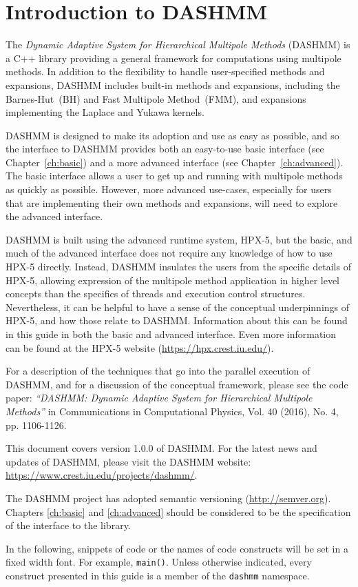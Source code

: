 \chapter{Introduction to DASHMM}
\label{ch:intro}

The {\it Dynamic Adaptive System for Hierarchical Multipole Methods}
(DASHMM) is a C++ library providing a general framework for
computations using multipole methods. In addition to the flexibility
to handle user-specified methods and expansions, DASHMM includes
built-in methods and expansions, including the Barnes-Hut~(BH) and
Fast Multipole Method~(FMM), and expansions implementing the Laplace
and Yukawa kernels.

DASHMM is designed to make its adoption and use as easy as possible,
and so the interface to DASHMM provides both an easy-to-use basic
interface (see Chapter~\ref{ch:basic}) and a more advanced interface
(see Chapter~\ref{ch:advanced}). The basic interface allows a
user to get up and running with multipole methods as quickly as
possible. However, more advanced use-cases, especially for users that
are implementing their own methods and expansions, will need to
explore the advanced interface.

DASHMM is built using the advanced runtime system, HPX-5, but the
basic, and much of the advanced interface does not require any
knowledge of how to use HPX-5 directly. Instead, DASHMM insulates the
users from the specific details of HPX-5, allowing expression of the
multipole method application in higher level concepts than the
specifics of threads and execution control structures. Nevertheless,
it can be helpful to have a sense of the conceptual underpinnings of
HPX-5, and how those relate to DASHMM. Information about this can be
found in this guide in both the basic and advanced interface. Even
more information can be found at the HPX-5 website
(\url{https://hpx.crest.iu.edu/}).

For a description of the techniques that go into the parallel
execution of DASHMM, and for a discussion of the conceptual framework,
please see the code paper: {\it ``DASHMM: Dynamic Adaptive System for
  Hierarchical Multipole Methods''} in Communications in Computational
Physics, Vol. 40 (2016), No. 4, pp. 1106-1126.

This document covers version 1.0.0 of DASHMM. For the latest news and
updates of DASHMM, please visit the DASHMM website:
\url{https://www.crest.iu.edu/projects/dashmm/}.

The DASHMM project has adopted semantic versioning (\url{http://semver.org}).
Chapters \ref{ch:basic} and \ref{ch:advanced} should be considered to be the
specification of the interface to the library.

In the following, snippets of code or the names of code constructs
will be set in a fixed width font. For example, {\tt main()}. Unless
otherwise indicated, every construct presented in this guide is a
member of the {\tt dashmm} namespace.